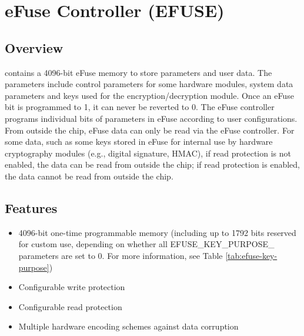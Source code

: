 \documentclass[main\_\_EN.tex]{subfiles}
\begin{document}

\ifglobal
\else
    {\let\clearpage\relax \listoftodos}
    {\let\clearpage\relax \listofdonetodos}
    \tableofcontents
\fi



\hypertarget{efuse}{}
\chapter{eFuse Controller (EFUSE)}
\label{mod:efuse}

\section{Overview}

\chipname{} contains a 4096-bit eFuse memory to store parameters and user data. The parameters include control parameters for some hardware modules, system data parameters and keys used for the encryption/decryption module. Once an eFuse bit is programmed to 1, it can never be reverted to 0. The eFuse controller programs individual bits of parameters in eFuse according to user configurations. From outside the chip, eFuse data can only be read via the eFuse controller. For some data, such as some keys stored in eFuse for internal use by hardware cryptography modules (e.g., digital signature, HMAC), if read protection is not enabled, the data can be read from outside the chip; if read protection is enabled, the data cannot be read from outside the chip.


\section{Features}

\begin{itemize}
    \item 4096-bit one-time programmable memory (including up to 1792 bits reserved for custom use, depending on whether all EFUSE\_KEY\_PURPOSE\_ parameters are set to 0. For more information, see Table \ref{tab:efuse-key-purpose})
    \item Configurable write protection
    \item Configurable read protection
    \item Multiple hardware encoding schemes against data corruption
\end{itemize}
\end{document}
